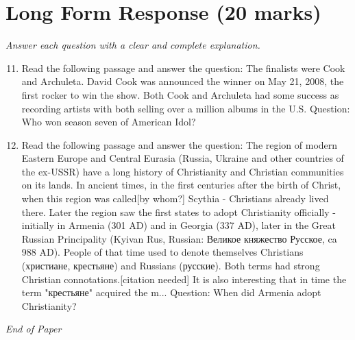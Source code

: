 \documentclass[12pt]{article}
\begin{document}
\section*{Long Form Response (20 marks)}
\textit{Answer each question with a clear and complete explanation.}
\begin{enumerate}[label=\arabic*.]
\setcounter{enumi}{10}
\item Read the following passage and answer the question: The finalists were Cook and Archuleta. David Cook was announced the winner on May 21, 2008, the first rocker to win the show. Both Cook and Archuleta had some success as recording artists with both selling over a million albums in the U.S. Question: Who won season seven of American Idol?
\item Read the following passage and answer the question: The region of modern Eastern Europe and Central Eurasia (Russia, Ukraine and other countries of the ex-USSR) have a long history of Christianity and Christian communities on its lands. In ancient times, in the first centuries after the birth of Christ, when this region was called[by whom?] Scythia - Christians already lived there. Later the region saw the first states to adopt Christianity officially - initially in Armenia (301 AD) and in Georgia (337 AD), later in the Great Russian Principality (Kyivan Rus, Russian: Великое княжество Русское, ca 988 AD). People of that time used to denote themselves Christians (христиане, крестьяне) and Russians (русские). Both terms had strong Christian connotations.[citation needed] It is also interesting that in time the term "крестьяне" acquired the m... Question: When did Armenia adopt Christianity?
\end{enumerate}

\vfill
\noindent\textit{End of Paper}
\end{document}
